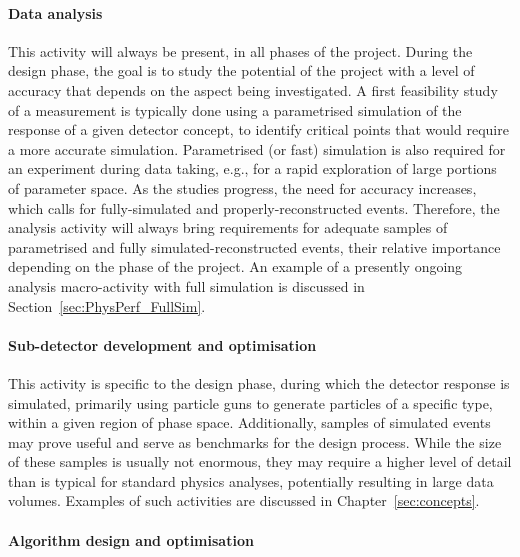 \paragraph{Data analysis}

This activity will always be present, in all phases of the project. 
During the design phase, the goal is to study the potential of the project with a level of accuracy that depends on the aspect being investigated. 
A first feasibility study of a measurement is typically done using a parametrised simulation of the response of a given detector concept, 
to identify critical points that would require a more accurate simulation. 
Parametrised (or fast) simulation is also required for an experiment during data taking, e.g., for a rapid exploration of large portions of parameter space. 
As the studies progress, the need for accuracy increases, which calls for  fully-simulated and properly-reconstructed events. 
Therefore, the analysis activity will always bring requirements for adequate samples of parametrised and fully simulated-reconstructed events, 
their relative importance depending on the phase of the project. 
An example of a presently ongoing analysis macro-activity with full simulation is discussed in Section~\ref{sec:PhysPerf_FullSim}. 

\paragraph{Sub-detector development and optimisation}

This activity is specific to the design phase, during which the detector response is simulated,
primarily using particle guns to generate particles of a specific type, within a given region of phase space. 
Additionally, samples of simulated events may prove useful and serve as benchmarks for the design process.
While the size of these samples is usually not enormous, 
they may require a higher level of detail than is typical for standard physics analyses, 
potentially resulting in large data volumes. 
Examples of such activities are discussed in Chapter~\ref{sec:concepts}.

\paragraph{Algorithm design and optimisation}

